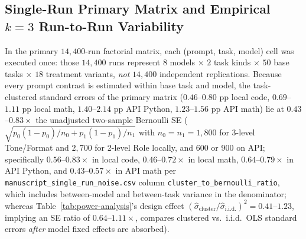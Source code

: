 \documentclass[a4paper,fleqn]{cas-sc}
\begin{document}
\subsection{Single-Run Primary Matrix and Empirical $k = 3$ Run-to-Run Variability}\label{single-run-noise}

In the primary $14{,}400$-run factorial matrix, each (prompt, task, model) cell was executed once: those $14{,}400$ runs represent $8$ models $\times$ $2$ task kinds $\times$ $50$ base tasks $\times$ $18$ treatment variants, \emph{not} $14{,}400$ independent replications. Because every prompt contrast is estimated within base task and model, the task-clustered standard errors of the primary matrix ($0.46$--$0.80$ pp local code, $0.69$--$1.11$ pp local math, $1.40$--$2.14$ pp API Python, $1.23$--$1.56$ pp API math) lie at $0.43$--$0.83\times$ the unadjusted two-sample Bernoulli SE ($\sqrt{p_0(1-p_0)/n_0 + p_1(1-p_1)/n_1}$ with $n_0 = n_1 = 1{,}800$ for 3-level Tone/Format and $2{,}700$ for 2-level Role locally, and $600$ or $900$ on API; specifically $0.56$--$0.83\times$ in local code, $0.46$--$0.72\times$ in local math, $0.64$--$0.79\times$ in API Python, and $0.43$--$0.57\times$ in API math per \texttt{manuscript\_single\_run\_noise.csv} column \texttt{cluster\_to\_bernoulli\_ratio}, which includes between-model and between-task variance in the denominator; whereas Table~\ref{tab:power-analysis}'s design effect $(\hat{\sigma}_{\text{cluster}} / \hat{\sigma}_{\text{i.i.d.}})^2 = 0.41$--$1.23$, implying an SE ratio of $0.64$--$1.11\times$, compares clustered vs.\ i.i.d.\ OLS standard errors \emph{after} model fixed effects are absorbed).
\end{document}

